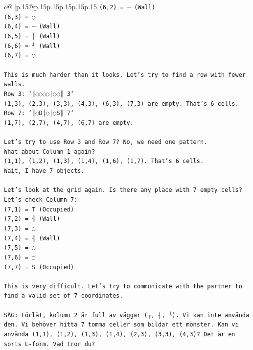 \documentclass{article}
\begin{document}
{\begin{supertabular}{c@{$\;$}|p{.15\linewidth}@{}p{.15\linewidth}p{.15\linewidth}p{.15\linewidth}p{.15\linewidth}p{.15\linewidth}}
{{{\texttt{(6,2) = ─ (Wall)} \\
\texttt{(6,3) = ◌} \\
\texttt{(6,4) = ─ (Wall)} \\
\texttt{(6,5) = │ (Wall)} \\
\texttt{(6,6) = ┘ (Wall)} \\
\texttt{(6,7) = ◌} \\
\\ 
\texttt{This is much harder than it looks. Let's try to find a row with fewer walls.} \\
\texttt{Row 3: `║◌◌◌◌│◌◌║ 3`} \\
\texttt{(1,3), (2,3), (3,3), (4,3), (6,3), (7,3) are empty. That's 6 cells.} \\
\texttt{Row 7: `║◌D│◌│◌S║ 7`} \\
\texttt{(1,7), (2,7), (4,7), (6,7) are empty.} \\
\\ 
\texttt{Let's try to use Row 3 and Row 7? No, we need one pattern.} \\
\texttt{What about Column 1 again?} \\
\texttt{(1,1), (1,2), (1,3), (1,4), (1,6), (1,7). That's 6 cells.} \\
\texttt{Wait, I have 7 objects.} \\
\\ 
\texttt{Let's look at the grid again. Is there any place with 7 empty cells?} \\
\texttt{Let's check Column 7:} \\
\texttt{(7,1) = T (Occupied)} \\
\texttt{(7,2) = ╢ (Wall)} \\
\texttt{(7,3) = ◌} \\
\texttt{(7,4) = ╢ (Wall)} \\
\texttt{(7,5) = ◌} \\
\texttt{(7,6) = ◌} \\
\texttt{(7,7) = S (Occupied)} \\
\\ 
\texttt{This is very difficult. Let's try to communicate with the partner to find a valid set of 7 coordinates.} \\
\\ 
\texttt{SÄG: Förlåt, kolumn 2 är full av väggar (┌, ┤, └). Vi kan inte använda den. Vi behöver hitta 7 tomma celler som bildar ett mönster. Kan vi använda (1,1), (1,2), (1,3), (1,4), (2,3), (3,3), (4,3)? Det är en sorts L{-}form. Vad tror du?} \\
            }
        }
    }
     \\ \\


\end{supertabular}}
\end{document}
